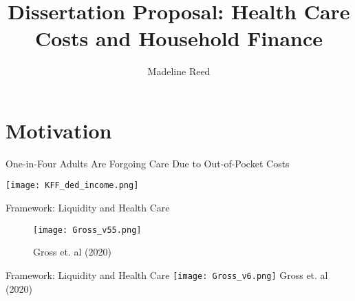 \documentclass[t, hyperref={colorlinks=true}, compress]{beamer}
\title[\color{white} ]{\small Dissertation Proposal: Health Care Costs and Household Finance}
\author{Madeline Reed}
\date[Oct 2nd]
\begin{document}
\begin{frame}
  \titlepage
\end{frame}  

\section{Motivation}








 


\begin{frame}{One-in-Four Adults Are Forgoing Care Due to Out-of-Pocket Costs}

\bigskip
\bigskip
\bigskip
\centering {
{\fontsize{80}{80}\selectfont {\faMale \space \faMale \space \faMale \space {\textcolor{gray}\faMale} }}
}
 
\end{frame}

\begin{frame}
\centering
\texttt{[image: KFF\_ded\_income.png]} 
\end{frame}






\begin{frame}{Framework: Liquidity and Health Care} 
\begin{figure}
\texttt{[image: Gross\_v55.png]} \caption{Gross et. al (2020)}
\end{figure}
\end{frame}

\begin{frame}{Framework: Liquidity and Health Care} 
\texttt{[image: Gross\_v6.png]} 
\footnotesize Gross et. al (2020)
\end{frame}
\end{document}
